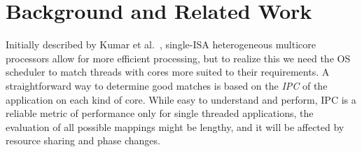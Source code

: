 \section{Background and Related Work}
\label{rw}

\begin{table}[htbp]
  \caption{Qualitative Analysis on Related Work}
  \begin{center}
  \label{rwt}
  \end{center}
\end{table}

Initially described by Kumar et al.~\cite{kumar2004single,kumar2003single}, single-ISA heterogeneous multicore processors allow for more efficient processing, but to realize this we need the OS scheduler to match threads with cores more suited to their requirements. A straightforward way to determine good matches is based on the \emph{IPC} of the application on each kind of core. While easy to understand and perform, IPC is a reliable metric of performance only for single threaded applications, the evaluation of all possible mappings might be lengthy, and it will be affected by resource sharing and phase changes.

